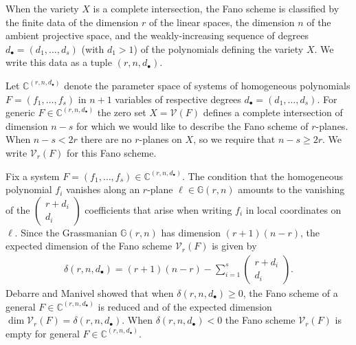 \documentclass[12pt]{amsart}
\theoremstyle{definition}
\newcommand{\gr}{\mathbb{G}}
\begin{document}
When the variety $X$ is a complete intersection, the Fano scheme is classified by the finite data of the dimension $r$ of the linear spaces, the dimension $n$ of the ambient projective space, and the weakly-increasing sequence of degrees $d_\bullet = (d_1,\dotsc,d_s)$ (with $d_1>1$) of the polynomials defining the variety $X$. We write this data as a tuple $(r,n,d_\bullet)$.

Let $\mathbb{C}^{(r,n,d_\bullet)}$ denote the parameter space of systems of homogeneous polynomials $F = (f_1,\dotsc,f_s)$ in $n+1$ variables of respective degrees $d_\bullet = (d_1,\dotsc,d_s)$. For generic $F\in\mathbb{C}^{(r,n,d_\bullet)}$ the zero set $X = \mathcal{V}(F)$ defines a complete intersection of dimension $n-s$ for which we would like to describe the Fano scheme of $r$-planes. When $n-s<2r$ there are no $r$-planes on $X$, so we require that $n-s\ge 2r$. We write $\mathcal{V}_r(F)$ for this Fano scheme.



%
Fix a system $F=(f_1,\dotsc,f_s)\in\mathbb{C}^{(r,n,d_\bullet)}$. The condition that the homogeneous polynomial $f_i$ vanishes along an $r$-plane $\ell\in\gr(r,n)$ amounts to the vanishing of the $\left(\begin{smallmatrix}r+d_i\\d_i\end{smallmatrix}\right)$ coefficients that arise when writing $f_i$ in local coordinates on $\ell$. Since the Grassmanian $\gr(r,n)$ has dimension $(r+1)(n-r)$, the expected dimension of the Fano scheme $\mathcal{V}_r(F)$ is given by
\begin{align*}
\delta(r,n,d_\bullet) = (r+1)(n-r) - \sum_{i=1}^s\begin{pmatrix}r+d_i\\d_i\end{pmatrix}.
\end{align*}
Debarre and Manivel \cite{DM} showed that when $\delta(r,n,d_\bullet)\ge 0$, the Fano scheme of a general $F\in\mathbb{C}^{(r,n,d_\bullet)}$ is reduced and of the expected dimension $\dim\mathcal{V}_r(F) = \delta(r,n,d_\bullet)$. When $\delta(r,n,d_\bullet)<0$ the Fano scheme $\mathcal{V}_r(F)$ is empty for general $F\in\mathbb{C}^{(r,n,d_\bullet)}$. 

\end{document}
